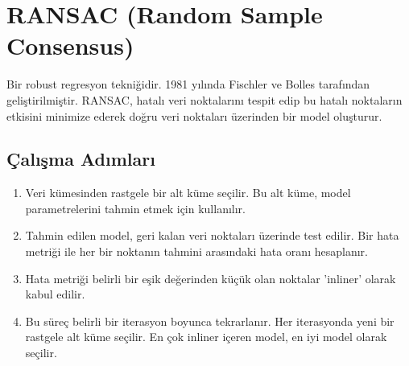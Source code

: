 \section{RANSAC (Random Sample Consensus)}
Bir robust regresyon tekniğidir. 1981 yılında Fischler ve Bolles tarafından geliştirilmiştir. RANSAC, hatalı veri noktalarını tespit edip bu hatalı noktaların etkisini minimize ederek doğru veri noktaları üzerinden bir model oluşturur. 

\subsection{Çalışma Adımları}
\begin{enumerate}
	\item Veri kümesinden rastgele bir alt küme seçilir. Bu alt küme, model parametrelerini tahmin etmek için kullanılır.
	\item Tahmin edilen model, geri kalan veri noktaları üzerinde test edilir. Bir hata metriği ile her bir noktanın tahmini arasındaki hata oranı hesaplanır.
	\item Hata metriği belirli bir eşik değerinden küçük olan noktalar 'inliner' olarak kabul edilir.
	\item Bu süreç belirli bir iterasyon boyunca tekrarlanır. Her iterasyonda yeni bir rastgele alt küme seçilir. En çok inliner içeren model, en iyi model olarak seçilir.
\end{enumerate}



\newpage